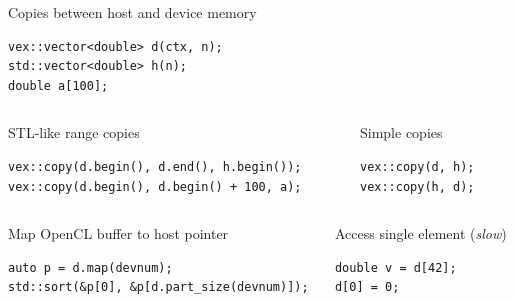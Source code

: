 \documentclass[@BEAMER_OPTIONS@]{beamer}
\begin{document}
\begin{frame}[fragile]{Copies between host and device memory}
    \begin{exampleblock}{}
        \begin{lstlisting}
vex::vector<double> d(ctx, n);
std::vector<double> h(n);
double a[100];
        \end{lstlisting}
    \end{exampleblock}
    \vspace{\baselineskip}
    \begin{columns}
        \begin{column}{0.5\textwidth}
            \begin{exampleblock}{STL-like range copies}
                \begin{lstlisting}
vex::copy(d.begin(), d.end(), h.begin());
vex::copy(d.begin(), d.begin() + 100, a);
                \end{lstlisting}
            \end{exampleblock}
        \end{column}
        \begin{column}{0.4\textwidth}
            \begin{exampleblock}{Simple copies}
                \begin{lstlisting}
vex::copy(d, h);
vex::copy(h, d);
                \end{lstlisting}
            \end{exampleblock}
        \end{column}
    \end{columns}
    \vspace{\baselineskip}
    \begin{columns}
        \begin{column}{0.5\textwidth}
            \begin{exampleblock}{Map OpenCL buffer to host pointer}
                \begin{lstlisting}
auto p = d.map(devnum);
std::sort(&p[0], &p[d.part_size(devnum)]);
                \end{lstlisting}
            \end{exampleblock}
        \end{column}
        \begin{column}{0.4\textwidth}
            \begin{exampleblock}{Access single element (\emph{slow})}
                \begin{lstlisting}
double v = d[42];
d[0] = 0;
                \end{lstlisting}
            \end{exampleblock}
        \end{column}
    \end{columns}
\end{frame}
\end{document}
